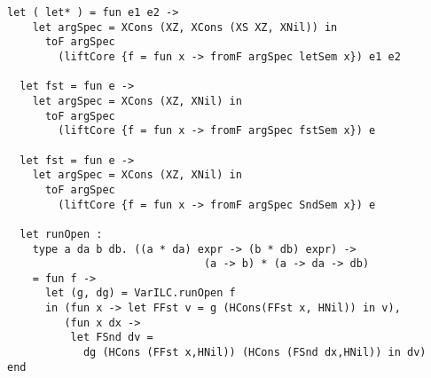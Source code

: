 \documentclass[uplatex]{sumiilab-paper}
\theoremstyle{mystyle}
\numberwithin{definition}{chapter} %
\begin{document}
\begin{lstlisting}[caption=ILCの埋め込み,label=src:ilc_unembedding]
  let ( let* ) = fun e1 e2 -> 
    let argSpec = XCons (XZ, XCons (XS XZ, XNil)) in 
      toF argSpec 
        (liftCore {f = fun x -> fromF argSpec letSem x}) e1 e2 

  let fst = fun e -> 
    let argSpec = XCons (XZ, XNil) in 
      toF argSpec 
        (liftCore {f = fun x -> fromF argSpec fstSem x}) e 

  let fst = fun e -> 
    let argSpec = XCons (XZ, XNil) in 
      toF argSpec 
        (liftCore {f = fun x -> fromF argSpec SndSem x}) e 

  let runOpen : 
    type a da b db. ((a * da) expr -> (b * db) expr) -> 
                               (a -> b) * (a -> da -> db) 
    = fun f -> 
      let (g, dg) = VarILC.runOpen f 
      in (fun x -> let FFst v = g (HCons(FFst x, HNil)) in v), 
         (fun x dx -> 
          let FSnd dv = 
            dg (HCons (FFst x,HNil)) (HCons (FSnd dx,HNil)) in dv) 
end

\end{lstlisting}
\end{document}
